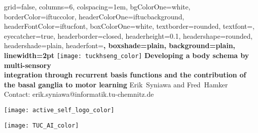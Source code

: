 \documentclass[portrait,final,a0paper,fontscale=0.33]{baposter}
\begin{document}
\begin{poster}%
	{
		grid=false,
		columns=6,
		colspacing=1em,
		bgColorOne=white,
		borderColor=iftuccolor,
		headerColorOne=iftucbackground,
		headerFontColor=iftucfont,
		boxColorOne=white,
		textborder=rounded,
		textfont=\small,
		eyecatcher=true,
		headerborder=closed,
		headerheight=0.1\textheight,
		headershape=rounded,
		headershade=plain,
		headerfont=\Large\bf, %
		boxshade=plain,
		background=plain,
		linewidth=2pt
	}
	{\texttt{[image: tuckhseng\_color]}} 
	{\bf\Large{Developing a body schema by multi-sensory\\ integration through recurrent basis functions and the contribution of the basal ganglia to motor learning}\vspace{5pt}}
	{\large Erik~Syniawa and Fred~Hamker \\ \vspace{0.5em}
	\small Contact: erik.syniawa@informatik.tu-chemnitz.de
	}
	{	
		\begin{minipage}[r]{0.1\textwidth}
			\texttt{[image: active\_self\_logo\_color]}
		\end{minipage}
		\hfill
		\begin{minipage}[r]{0.1\textwidth}
			\texttt{[image: TUC\_AI\_color]}
		\end{minipage}
		
	}

\end{poster}
\end{document}
